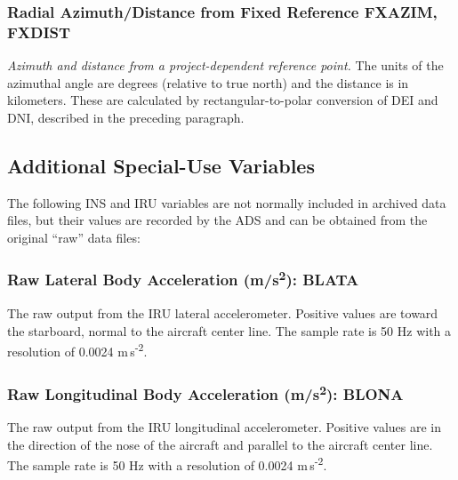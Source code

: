 \documentclass[
]{book}
\begin{document}
\hypertarget{fxaxim}{%
\subsubsection*{Radial Azimuth/Distance from Fixed Reference FXAZIM, FXDIST}\label{fxaxim}}

\emph{Azimuth and distance from a project-dependent reference point.} The units of the azimuthal angle are degrees (relative to true north) and the distance is in kilometers. These are calculated by rectangular-to-polar conversion of DEI and DNI, described in the preceding paragraph.

\hypertarget{special-use-irs}{%
\subsection{Additional Special-Use Variables}\label{special-use-irs}}

The following INS and IRU variables are not normally included in archived data files, but their values are recorded by the ADS and can be obtained from the original ``raw'' data files:

\hypertarget{blata}{%
\subsubsection*{\texorpdfstring{Raw Lateral Body Acceleration (m/s\textsuperscript{2}): BLATA}{Raw Lateral Body Acceleration (m/s2): BLATA}}\label{blata}}

The raw output from the IRU lateral accelerometer. Positive values are toward the starboard, normal to the aircraft center line. The sample rate is 50 Hz with a resolution of 0.0024 m s\textsuperscript{-2}.

\hypertarget{blona}{%
\subsubsection*{\texorpdfstring{Raw Longitudinal Body Acceleration (m/s\textsuperscript{2}): BLONA}{Raw Longitudinal Body Acceleration (m/s2): BLONA}}\label{blona}}

The raw output from the IRU longitudinal accelerometer. Positive values are in the direction of the nose of the aircraft and parallel to the aircraft center line. The sample rate is 50 Hz with a resolution of 0.0024 m s\textsuperscript{-2}.
\end{document}
